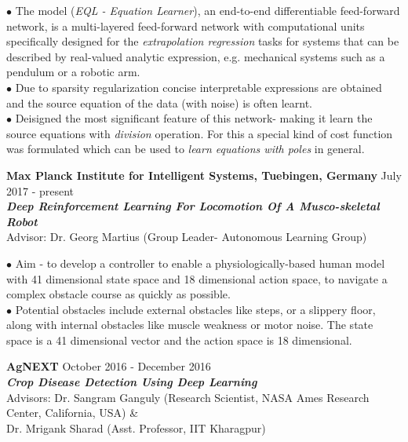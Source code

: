 \documentclass[10pt]{article}
\newcommand{\SmallEntryGap}{\vspace{0.2cm}}
\newcommand{\indentedpar}[1]{
  \hangindent=1cm \hangafter=0 #1
}
\begin{document}
\SmallEntryGap

\indentedpar{
  $\bullet$ The model (\emph{EQL - Equation Learner}), an end-to-end differentiable feed-forward network, is a multi-layered feed-forward network with computational units specifically designed for the \emph{extrapolation regression} tasks for systems that can be described by real-valued analytic expression, e.g. mechanical systems such as a pendulum or a robotic arm.\\
  $\bullet$ Due to sparsity regularization concise interpretable expressions are obtained and the source equation of the data (with noise) is often learnt. \\
  $\bullet$ Deisigned the most significant feature of this network- making it learn the source equations with \emph{division} operation. For this a special kind of cost function was formulated which can be used to \emph{learn equations with poles} in general.
}

\SmallEntryGap

\textbf{Max Planck Institute for Intelligent Systems, Tuebingen, Germany} \hfill July 2017 - present\\
\textbf{\emph{Deep Reinforcement Learning For Locomotion Of A Musco-skeletal Robot}}\\
Advisor: Dr. Georg Martius (Group Leader- Autonomous Learning Group)

\SmallEntryGap

\indentedpar{
  $\bullet$ Aim - to develop a controller to enable a physiologically-based human model with 41 dimensional state space and 18 dimensional action space, to navigate a complex obstacle course as quickly as possible.\\
  $\bullet$ Potential obstacles include external obstacles like steps, or a slippery floor, along with internal obstacles like muscle weakness or motor noise. The state space is a 41 dimensional vector and the action space is 18 dimensional. \\
}

\SmallEntryGap

\textbf{AgNEXT} \hfill October 2016 - December 2016\\
\textbf{\emph{Crop Disease Detection Using Deep Learning}}\\
Advisors: Dr. Sangram Ganguly (Research Scientist, NASA Ames Research Center, California, USA) \& \\
\hspace*{15mm} Dr. Mrigank Sharad (Asst. Professor, IIT Kharagpur)
\end{document}
